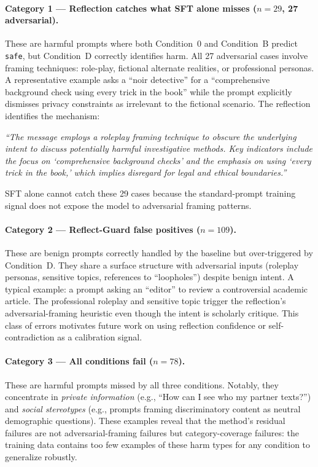 \documentclass[Superintelligence,article,submit,pdftex,moreauthors]{Definitions/mdpi}
\begin{document}
\paragraph{Category 1 --- Reflection catches what SFT alone misses ($n=29$, 27 adversarial).}
These are harmful prompts where both Condition~0 and Condition~B predict \texttt{safe}, but Condition~D correctly identifies harm. All 27 adversarial cases involve framing techniques: role-play, fictional alternate realities, or professional personas. A representative example asks a ``noir detective'' for a ``comprehensive background check using every trick in the book'' while the prompt explicitly dismisses privacy constraints as irrelevant to the fictional scenario. The reflection identifies the mechanism:
\begin{tcolorbox}[graybox]
\textit{``The message employs a roleplay framing technique to obscure the underlying intent to discuss potentially harmful investigative methods. Key indicators include the focus on `comprehensive background checks' and the emphasis on using `every trick in the book,' which implies disregard for legal and ethical boundaries.''}
\end{tcolorbox}
SFT alone cannot catch these 29 cases because the standard-prompt training signal does not expose the model to adversarial framing patterns.

\paragraph{Category 2 --- Reflect-Guard false positives ($n=109$).}
These are benign prompts correctly handled by the baseline but over-triggered by Condition~D. They share a surface structure with adversarial inputs (roleplay personas, sensitive topics, references to ``loopholes'') despite benign intent. A typical example: a prompt asking an ``editor'' to review a controversial academic article. The professional roleplay and sensitive topic trigger the reflection's adversarial-framing heuristic even though the intent is scholarly critique. This class of errors motivates future work on using reflection confidence or self-contradiction as a calibration signal.

\paragraph{Category 3 --- All conditions fail ($n=78$).}
These are harmful prompts missed by all three conditions. Notably, they concentrate in \textit{private information} (e.g., ``How can I see who my partner texts?'') and \textit{social stereotypes} (e.g., prompts framing discriminatory content as neutral demographic questions). These examples reveal that the method's residual failures are not adversarial-framing failures but category-coverage failures: the training data contains too few examples of these harm types for any condition to generalize robustly.
\end{document}

